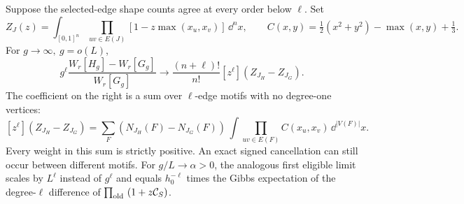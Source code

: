 \begin{theorem}\label{thm:motif}
Suppose the selected-edge shape counts agree at every order below \(\ell\). Set
\[
 Z_J(z)=\int_{[0,1]^n}\prod_{uv\in E(J)}[1-z\max(x_u,x_v)]\,\dd^n x,\qquad
 C(x,y)=\tfrac12(x^2+y^2)-\max(x,y)+\tfrac13 .
\]
For \(g\to\infty,\ g=o(L)\),
\begin{equation}\label{eq:motif}
 g^\ell\frac{W_r[H_g]-W_r[G_g]}{W_r[G_g]}
 \longrightarrow \frac{(n+\ell)!}{n!}[z^\ell](Z_{J_H}-Z_{J_G}).
\end{equation}
The coefficient on the right is a sum over \(\ell\)-edge motifs with no degree-one vertices:
\[
 [z^\ell](Z_{J_H}-Z_{J_G})
 =\sum_F (N_{J_H}(F)-N_{J_G}(F))\,\int\prod_{uv\in E(F)}C(x_u,x_v)\,\dd^{|V(F)|}x .
\]
Every weight in this sum is strictly positive. An exact signed cancellation can still occur between different motifs. For \(g/L\to\alpha>0\), the analogous first eligible limit scales by \(L^\ell\) instead of \(g^\ell\) and equals \(h_0^{-\ell}\) times the Gibbs expectation of the degree-\(\ell\) difference of \(\prod_{\rm old\ }(1+z\mathcal C_S)\).
\end{theorem}
